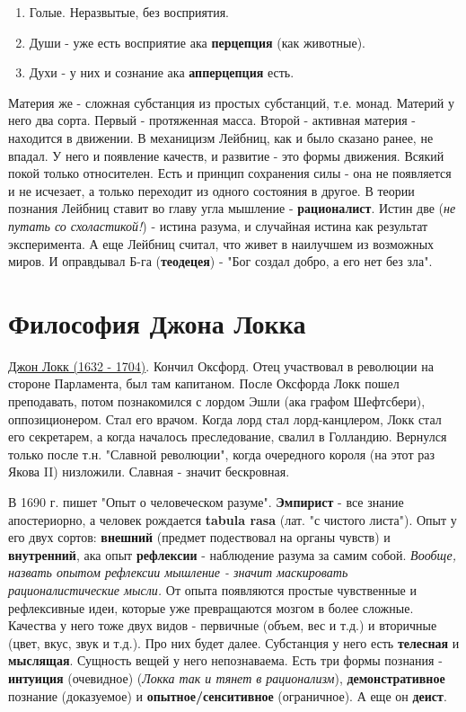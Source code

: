 \begin{enumerate}
\item Голые. Неразвытые, без восприятия.
\item Души - уже есть восприятие ака \textbf{перцепция} (как животные).
\item Духи - у них и сознание ака \textbf{апперцепция} есть.
\end{enumerate}
Материя же - сложная субстанция из простых субстанций, т.е. монад. Материй у него два сорта. Первый - протяженная масса.
Второй - активная материя - находится в движении. В механицизм Лейбниц, как и было сказано ранее, не впадал. У него и появление качеств, и развитие - это формы движения.  Всякий покой только относителен. Есть и принцип сохранения силы - она не появляется и не исчезает, а только переходит из одного состояния в другое. В теории познания Лейбниц ставит во главу угла мышление - \textbf{рационалист}. Истин две (\textit{не путать со схоластикой!}) - истина разума, и случайная истина как результат эксперимента. А еще Лейбниц считал, что живет в наилучшем из возможных миров. И оправдывал Б-га (\textbf{теодецея}) - "Бог создал добро, а его нет без зла".


\section{Философия Джона Локка}
\underline{Джон Локк (1632 - 1704)}. Кончил Оксфорд. Отец участвовал в революции на стороне Парламента, был там капитаном. После Оксфорда Локк пошел преподавать, потом познакомился с лордом Эшли (ака графом Шефтсбери), оппозиционером. Стал его врачом. Когда лорд стал лорд-канцлером, Локк стал его секретарем, а когда началось преследование, свалил в Голландию. Вернулся только после т.н. "Славной революции", когда очередного короля (на этот раз Якова II) низложили. Славная - значит бескровная. 

В 1690 г. пишет "Опыт о человеческом разуме". \textbf{Эмпирист} - все  знание апостериорно, а человек рождается \textbf{tabula rasa} (лат. "с чистого листа"). Опыт у его двух сортов: \textbf{внешний} (предмет подествовал на органы чувств) и \textbf{внутренний}, ака опыт \textbf{рефлексии} - наблюдение разума за самим собой. \textit{Вообще, назвать опытом рефлексии мышление - значит маскировать рационалистические мысли.} От опыта появляются простые чувственные и рефлексивные идеи, которые уже превращаются мозгом в более сложные. Качества у него тоже двух видов - первичные (объем, вес и т.д.) и вторичные (цвет, вкус, звук и т.д.). Про них будет далее. Субстанция у него есть \textbf{телесная} и \textbf{мыслящая}. Сущность вещей у него непознаваема. Есть три формы познания - \textbf{интуиция} (очевидное) (\textit{Локка так и тянет в рационализм}), \textbf{демонстративное} познание (доказуемое) и \textbf{опытное/сенситивное} (ограничное). А еще он \textbf{деист}.

